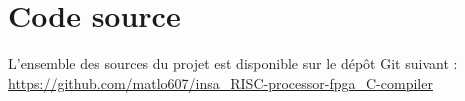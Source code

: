 \documentclass[a4paper]{report}
\begin{document}
\newpage

\listoffigures

\newpage

\chapter*{Code source} 

L'ensemble des sources du projet est disponible sur le dépôt Git suivant :\\
\url{https://github.com/matlo607/insa_RISC-processor-fpga_C-compiler}
\end{document}

